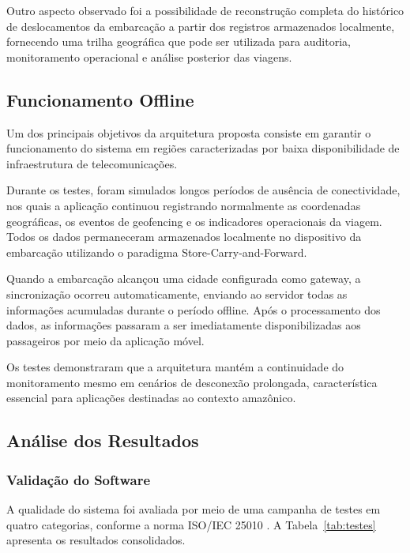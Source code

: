 \documentclass[12pt]{article}
\begin{document}
Outro aspecto observado foi a possibilidade de reconstrução completa do histórico de deslocamentos da embarcação a partir dos registros armazenados localmente, fornecendo uma trilha geográfica que pode ser utilizada para auditoria, monitoramento operacional e análise posterior das viagens.

\subsection{Funcionamento Offline}
Um dos principais objetivos da arquitetura proposta consiste em garantir o funcionamento do sistema em regiões caracterizadas por baixa disponibilidade de infraestrutura de telecomunicações.

Durante os testes, foram simulados longos períodos de ausência de conectividade, nos quais a aplicação continuou registrando normalmente as coordenadas geográficas, os eventos de geofencing e os indicadores operacionais da viagem. Todos os dados permaneceram armazenados localmente no dispositivo da embarcação utilizando o paradigma Store-Carry-and-Forward.

Quando a embarcação alcançou uma cidade configurada como gateway, a sincronização ocorreu automaticamente, enviando ao servidor todas as informações acumuladas durante o período offline. Após o processamento dos dados, as informações passaram a ser imediatamente disponibilizadas aos passageiros por meio da aplicação móvel.

Os testes demonstraram que a arquitetura mantém a continuidade do monitoramento mesmo em cenários de desconexão prolongada, característica essencial para aplicações destinadas ao contexto amazônico.

\subsection{Análise dos Resultados}
\subsubsection{Validação do Software}
A qualidade do sistema foi avaliada por meio de uma campanha de testes em quatro categorias, conforme a norma ISO/IEC 25010 \cite{iso25010}. A Tabela~\ref{tab:testes} apresenta os resultados consolidados.
\end{document}
